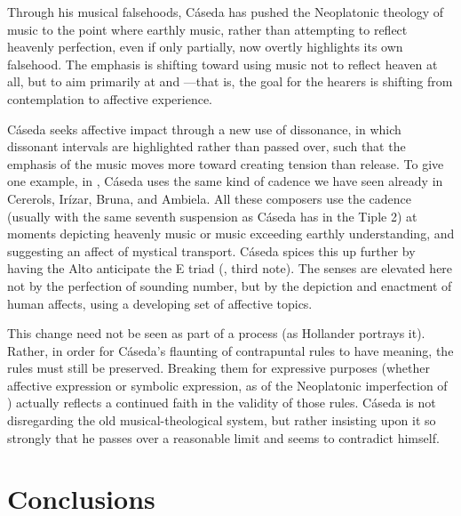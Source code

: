 Through his musical falsehoods, Cáseda has pushed the Neoplatonic theology of music to the point where earthly music, rather than attempting to reflect heavenly perfection, even if only partially, now overtly highlights its own falsehood.
The emphasis is shifting toward using music not to reflect heaven at all, but to aim primarily at  and ---that is, the goal for the hearers is shifting from contemplation to affective experience.

Cáseda seeks affective impact through a new use of dissonance, in which dissonant intervals are highlighted rather than passed over, such that the emphasis of the music moves more toward creating tension than release.
To give one example, in , Cáseda uses the same kind of  cadence we have seen already in Cererols, Irízar, Bruna, and Ambiela.  %
All these composers use the cadence (usually with the same seventh suspension as Cáseda has in the Tiple 2) at moments depicting heavenly music or music exceeding earthly understanding, and suggesting an affect of mystical transport.
Cáseda spices this up further by having the Alto anticipate the E\fl{} triad (, third note).
The senses are elevated here not by the perfection of sounding number, but by the depiction and enactment of human affects, using a developing set of affective topics.

This change need not be seen as part of a  process (as Hollander portrays it).
Rather, in order for Cáseda's flaunting of contrapuntal rules to have meaning, the rules must still be preserved.
Breaking them for expressive purposes (whether affective expression or symbolic expression, as of the Neoplatonic imperfection of ) actually reflects a continued faith in the validity of those rules.
Cáseda is not disregarding the old musical-theological system, but rather insisting upon it so strongly that he passes over a reasonable limit and seems to contradict himself.


\section{Conclusions}

